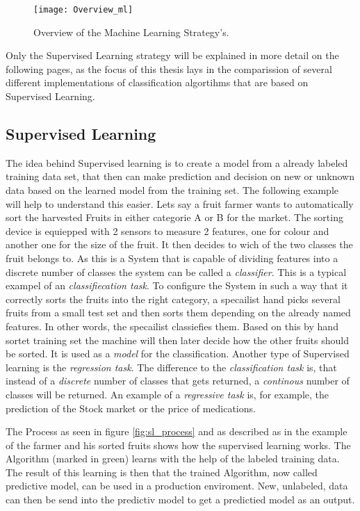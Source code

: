 \documentclass[12pt,oneside,a4paper,parskip]{scrbook}
\begin{document}
\begin{figure}
  \texttt{[image: Overview\_ml]}
  \caption{Overview of the Machine Learning Strategy's.}
  \label{fig:overview_ML}
\end{figure}

Only the Supervised Learning strategy will be explained in more detail on the following pages, as the focus of this 
thesis lays in the comparission of several different implementations of classification algortihms that are based on 
Supervised Learning.
 

\cite{IntroML}

\subsection{Supervised Learning}

The idea behind Supervised learning is to create a model from a already labeled training data set, that then can make 
prediction and decision on new or unknown data based on the learned model from the training set. 
The following example will help to understand this easier.
Lets say a fruit farmer wants to automatically sort the harvested Fruits in either categorie A or B for the market. 
The sorting device is equiepped with 2 sensors to measure 2 features, one for colour and another one for the size of the 
fruit. It then decides to wich of the two classes the fruit belongs to. As this is a System that is capable of dividing 
features into a discrete number of classes the system can be called a \textit{classifier}. 
This is a typical exampel of an \textit{classifiecation task}.
To configure the System in such a way that it correctly sorts the fruits into the right category, 
a specailist hand picks several fruits from a small test set and then sorts them depending on the already named features. 
In other words, the specailist classiefies them. Based on this by hand sortet training set the machine will then later 
decide how the other fruits should be sorted. It is used as a \textit{model} for the classification. \cite{IntroAI}
Another type of Supervised learning is the \textit{regression task}. The difference to the \textit{classification task} is, 
that instead of a \textit{discrete} number of classes that gets returned, a \textit{continous} number of classes will be 
returned. An example of a \textit{regressive task} is, for example, the prediction of the Stock market or the price of 
medications.

The Process as seen in figure \ref{fig:sl_process} and as described as in the example of the farmer and his sorted 
fruits shows how the supervised learning works. The Algorithm (marked in green) learns with the help of the labeled 
training data. The result of this learning is then that the trained Algorithm, now called predictive model, 
can be used in a production enviroment.
New, unlabeled, data can then be send into the predictiv model to get a predictied model as an output. \cite{PythonML}
\end{document}
